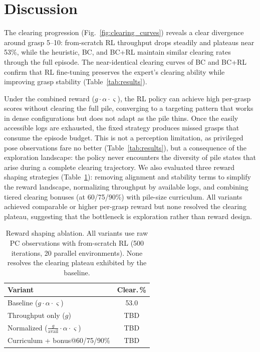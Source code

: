 \documentclass[conference]{IEEEtran}
\begin{document}
\section{Discussion}

The clearing progression (Fig.~\ref{fig:clearing_curves}) reveals a clear divergence around grasp 5--10: from-scratch RL throughput drops steadily and plateaus near 53\%, while the heuristic, BC, and BC+RL maintain similar clearing rates through the full episode. The near-identical clearing curves of BC and BC+RL confirm that RL fine-tuning preserves the expert's clearing ability while improving grasp stability (Table~\ref{tab:results}).

Under the combined reward ($g \cdot \alpha \cdot \varsigma$), the RL policy can achieve high per-grasp scores without clearing the full pile, converging to a targeting pattern that works in dense configurations but does not adapt as the pile thins.
Once the easily accessible logs are exhausted, the fixed strategy produces missed grasps that consume the episode budget.
This is not a perception limitation, as privileged pose observations fare no better (Table~\ref{tab:results}), but a consequence of the exploration landscape: the policy never encounters the diversity of pile states that arise during a complete clearing trajectory.
We also evaluated three reward shaping strategies (Table~\ref{tab:reward_ablation}): removing alignment and stability terms to simplify the reward landscape, normalizing throughput by available logs, and combining tiered clearing bonuses (at 60/75/90\%) with pile-size curriculum. All variants achieved comparable or higher per-grasp reward but none resolved the clearing plateau, suggesting that the bottleneck is exploration rather than reward design.

\begin{table}[t]
\centering
\caption{Reward shaping ablation. All variants use raw PC observations
with from-scratch RL (500 iterations, 20 parallel environments).
None resolves the clearing plateau exhibited by the baseline.}
\label{tab:reward_ablation}
\setlength{\tabcolsep}{3pt}
\begin{tabular}{lc}
\toprule
Variant & Clear.\,\% \\
\midrule
Baseline ($g \cdot \alpha \cdot \varsigma$) & 53.0 \\
Throughput only ($g$) & TBD \\
Normalized ($\frac{g}{\text{avail}} \cdot \alpha \cdot \varsigma$) & TBD \\
Curriculum + bonus@60/75/90\% & TBD \\
\bottomrule
\end{tabular}
\end{table}
\end{document}
